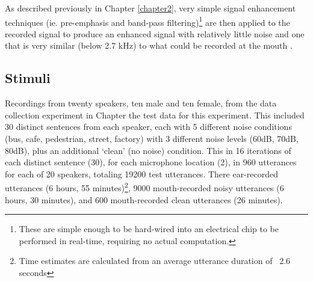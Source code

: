As described previously in Chapter \DIFdelbegin {}\DIFdelend \ref{chapter2}, very simple signal enhancement techniques (ie. pre-emphasis and band-pass filtering)\footnote{These are simple enough to be hard-wired into an electrical chip to be performed in real-time, requiring no actual computation.} are then applied to the recorded signal to produce an enhanced signal with relatively little noise and one that is very similar (below 2.7 kHz) to what could be recorded at the mouth \DIFaddbegin {}\DIFaddend .

\subsection{Stimuli}
\DIFaddbegin \label{chap4:methods:stimuli}
\DIFaddend 

Recordings from twenty speakers, ten male and ten female, from the data collection experiment in Chapter \DIFdelbegin {}\DIFdelend \DIFaddbegin {}\DIFaddend the test data for this experiment.  This included 30 distinct sentences from each speaker, each with 5 different noise conditions (bus, cafe, pedestrian, street, factory) with 3 different noise levels (60dB, 70dB, 80dB), plus an additional `clean' (no noise) condition.  This \DIFdelbegin {}\DIFdelend \DIFaddbegin {}\DIFaddend in 16 iterations of each distinct sentence (30), for each microphone location (2), \DIFdelbegin {}\DIFdelend \DIFaddbegin {}\DIFaddend in 960 utterances for each of 20 speakers, totaling 19200 test utterances.  There \DIFdelbegin {}\DIFdelend \DIFaddbegin {} ear-recorded utterances (6 hours, 55 minutes)\footnote{Time estimates are calculated from an average utterance duration of ~2.6 seconds}, 9000 mouth-recorded noisy utterances (6 hours, 30 minutes), and 600 mouth-recorded clean utterances (26 minutes).

